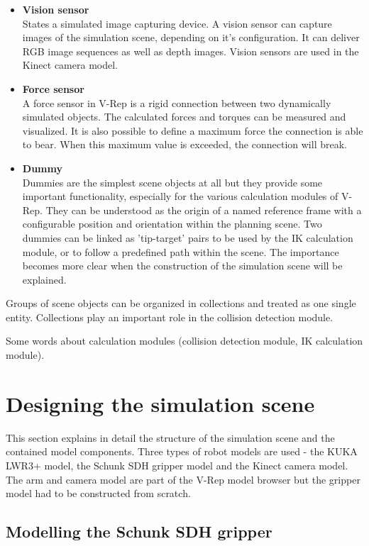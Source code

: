 \begin{itemize}
\item \textbf{Vision sensor} \\
States a simulated image capturing device. A vision sensor can capture images of the simulation scene, depending on it's configuration. It can deliver RGB image sequences as well as depth images. Vision sensors are used in the Kinect camera model.

\item \textbf{Force sensor} \\
A force sensor in V-Rep is a rigid connection between two dynamically simulated objects. The calculated forces and torques can be measured and visualized. It is also possible to define a maximum force the connection is able to bear. When this maximum value is exceeded, the connection will break.

\item \textbf{Dummy} \\
Dummies are the simplest scene objects at all but they provide some important functionality, especially for the various calculation modules of V-Rep. They can be understood as the origin of a named reference frame with a configurable position and orientation within the planning scene. Two dummies can be linked as 'tip-target' pairs to be used by the IK calculation module, or to follow a predefined path within the scene. The importance becomes more clear when the construction of the simulation scene will be explained. 

\end{itemize}

Groups of scene objects can be organized in collections and treated as one single entity. Collections play an important role in the collision detection module.

Some words about calculation modules (collision detection module, IK calculation module).


\section{Designing the simulation scene}
This section explains in detail the structure of the simulation scene and the contained model components. Three types of robot models are used - the KUKA LWR3+ model, the Schunk SDH gripper model and the Kinect camera model. The arm and camera model are part of the V-Rep model browser but the gripper model had to be constructed from scratch.

\subsection{Modelling the Schunk SDH gripper}

